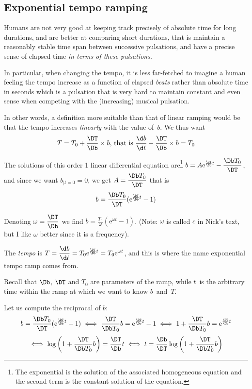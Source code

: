 \documentclass[10pt]{article}
\begin{document}
\subsection{Exponential tempo ramping}

\def\e{\mathrm{e}}

Humans are not very good at keeping track precisely of absolute time for long
durations, and are better at comparing short durations, that is maintain a
reasonably stable time span between successive pulsations, and have a precise
sense of elapsed time \emph{in terms of these pulsations}.

In particular, when changing the tempo, it is less far-fetched to imagine a
human feeling the tempo increase as a function of elapsed \emph{beats} rather
than absolute time in seconds which is a pulsation that is very hard to maintain
constant and even sense when competing with the (increasing) musical pulsation.

In other words, a definition more suitable than that of linear ramping would be
that the tempo increases \emph{linearly} with the value of~$b$. We thus want
\[ T = T_0 + \dfrac{\DT}{\Db}\times b
    \text{, that is }
\dfrac{\d b}{\d t} - \dfrac{\DT}{\Db}\times b = T_0 \]

The solutions of this order 1 linear differential equation are\footnote{The
exponential is the solution of the associated homogeneous equation and the
second term is the constant solution of the equation.}
$b = A \e^{\frac{\DT}{\Db}t} - \dfrac{\Db T_0}{\DT}$, and
since we want $b_{|t=0} = 0$, we get $A = \dfrac{\Db T_0}{\DT}$ that is
\[ b = \dfrac{\Db T_0}{\DT} (\e^{\frac{\DT}{\Db}t} - 1) \]

Denoting $\omega = \dfrac{\DT}{\Db}$ we find
$b = \frac{T_0}{\omega} (\e^{\omega t} - 1)$.
(Note: $\omega$ is called $c$ in Nick's text, but I like $\omega$ better since
it is a frequency).

The \emph{tempo} is $T = \dfrac{\d b}{\d t}
= T_0 \e^{\frac{\DT}{\Db}t} = T_0 \e^{\omega t}$, and this is where the name
exponential tempo ramp comes from.

Recall that $\Db$, $\DT$ and $T_0$ are parameters of the ramp, while $t$~is the
arbitrary time within the ramp at which we want to know $b$~and~$T$.

Let us compute the reciprocal of $b$:
\[
    b = \dfrac{\Db T_0}{\DT} (\e^{\frac{\DT}{\Db}t} - 1)
    \iff
    \dfrac{\DT}{\Db T_0} b = \e^{\frac{\DT}{\Db}t} - 1
    \iff
    1 + \dfrac{\DT}{\Db T_0} b = \e^{\frac{\DT}{\Db}t}
\]
\[
    \iff
    \log \left( 1 + \dfrac{\DT}{\Db T_0} b \right) = \frac{\DT}{\Db}t
    \iff
    t = \frac{\Db}{\DT} \log \left( 1 + \dfrac{\DT}{\Db T_0} b \right)
\]
\end{document}
